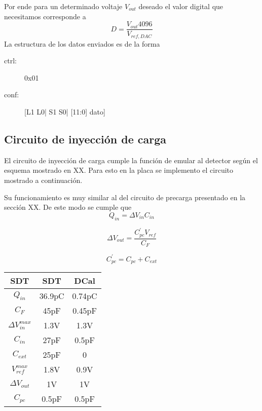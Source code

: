 Por ende para un determinado voltaje $V_{out}$ deseado el valor digital que necesitamos corresponde a 
\begin{equation}
D =\frac{V_{out}4096}{V_{ref,DAC}}
\end{equation}
La estructura de los datos enviados es de la forma
\begin{description}
\item[ctrl:] 0x01
\item[conf:] [L1 L0| S1 S0| [11:0] dato]
\end{description}

\subsection{Circuito de inyección de carga}
El circuito de inyección de carga cumple la función de emular al detector según el esquema mostrado en XX. Para esto en la placa se implemento el circuito mostrado a continuación.

Su funcionamiento es muy similar al del circuito de precarga presentado en la sección XX. De este modo se cumple que 
\begin{equation}
Q_{in}= \Delta V_{in}C_{in}
\end{equation}

\begin{equation}
\Delta V_{out}=\frac{C_{pc}^{\prime}V_{ref}}{C_F}
\end{equation}

\begin{equation}
C_{pc}^{\prime}=C_{pc}+ C_{ext}
\end{equation}

\begin{table}
\centering
\begin{tabular}{|c|c|c|}
\hline 
SDT & SDT & DCal \\ 
\hline 
\hline
$Q_{in}$ & 36.9pC & 0.74pC \\ 
\hline 
$C_F$ & 45pF & 0.45pF \\ 
\hline 
$\Delta V_{in}^{max}$ & 1.3V & 1.3V \\ 
\hline 
$C_{in}$ & 27pF & 0.5pF \\ 
\hline 
$C_{ext}$ & 25pF & 0 \\ 
\hline 
$V_{ref}^{max}$ & 1.8V & 0.9V \\ 
\hline 
$\Delta V_{out}$ & 1V & 1V \\ 
\hline 
$C_{pc}$ & 0.5pF & 0.5pF \\ 
\hline 
\end{tabular} 
\end{table}
